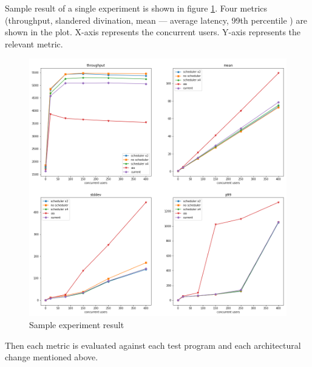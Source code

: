 Sample result of a single experiment is shown in figure \ref{sample_result}. Four metrics (throughput, slandered divination, mean — average latency, 99th percentile  ) are shown in the plot. X-axis represents the concurrent users. Y-axis represents the  relevant metric. 

 \begin{figure}[htbp]
 	\begin{center}
 		\includegraphics[scale=0.35]{figures/prime_small test results.png}
 	\end{center}
 	\caption{Sample experiment result}
 	\label{sample_result}
 \end{figure}

Then each metric is evaluated against each test program and each architectural change mentioned above.

